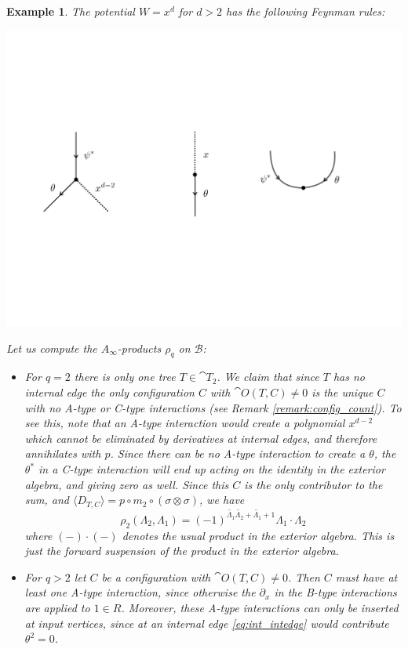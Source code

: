 \documentclass[english,letter paper,12pt,leqno]{article}
\theoremstyle{example}
\newtheorem{example}[theorem]{Example}
\numberwithin{equation}{section}
\def\be{\begin{equation}}
\def\ee{\end{equation}}
\begin{document}
\begin{example} The potential $W = x^d$ for $d > 2$ has the following Feynman rules:
\begin{center}
\includegraphics[scale=0.45]{dia9}
\end{center}
Let us compute the $A_\infty$-products $\rho_q$ on $\mathscr{B}$:
\begin{itemize}
\item For $q = 2$ there is only one tree $T \in \cat{T}_2$. We claim that since $T$ has no internal edge the only configuration $C$ with $\cat{O}(T,C) \neq 0$ is the unique $C$ with no A-type or C-type interactions (see Remark \ref{remark:config_count}). To see this, note that an A-type interaction would create a polynomial $x^{d-2}$ which cannot be eliminated by derivatives at internal edges, and therefore annihilates with $p$. Since there can be no A-type interaction to create a $\theta$, the $\theta^*$ in a C-type interaction will end up acting on the identity in the exterior algebra, and giving zero as well. Since this $C$ is the only contributor to the sum, and $\langle D_{T,C} \rangle = p \circ m_2 \circ (\sigma \otimes \sigma)$, we have
\be\label{eq:a_type_product}
\rho_2( \Lambda_2, \Lambda_1 ) = (-1)^{\widetilde{\Lambda_1} \widetilde{\Lambda_2} + \widetilde{\Lambda_1} + 1} \Lambda_1 \cdot \Lambda_2
\ee
where $(-) \cdot (-)$ denotes the usual product in the exterior algebra. This is just the forward suspension of the product in the exterior algebra.

\item For $q > 2$ let $C$ be a configuration with $\cat{O}(T,C) \neq 0$. Then $C$ must have at least one A-type interaction, since otherwise the $\partial_x$ in the B-type interactions are applied to $1 \in R$. Moreover, these A-type interactions can only be inserted at input vertices, since at an internal edge \eqref{eq:int_intedge} would contribute $\theta^2 = 0$.


\end{itemize}
\end{example}
\end{document}
